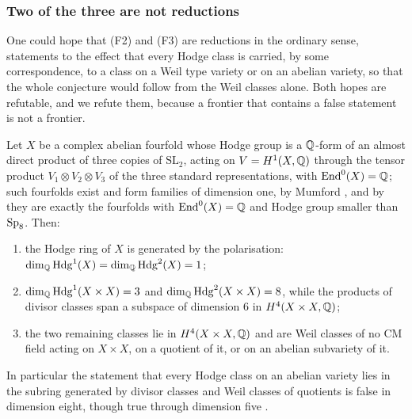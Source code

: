 \subsubsection*{Two of the three are not reductions}

One could hope that (F2) and (F3) are reductions in the ordinary sense,
statements to the effect that every Hodge class is carried, by some
correspondence, to a class on a Weil type variety or on an abelian variety,
so that the whole conjecture would follow from the Weil classes alone. Both
hopes are refutable, and we refute them, because a frontier that contains a
false statement is not a frontier.

\begin{proposition}\label{prop:mumfordproduct}
Let $X$ be a complex abelian fourfold whose Hodge group is a $\mathbb{Q}$-form of an
almost direct product of three copies of $\mathrm{SL}_{2}$, acting on
$V=H^{1}(X,\mathbb{Q})$ through the tensor product $V_{1}\otimes V_{2}\otimes V_{3}$
of the three standard representations, with $\operatorname{End}^{0}(X)=\mathbb{Q}$; such
fourfolds exist and form families of dimension one, by Mumford
\cite{Mum69}, and by \cite[2.5(i)]{MZ99} they are exactly the fourfolds
with $\operatorname{End}^{0}(X)=\mathbb{Q}$ and Hodge group smaller than $\operatorname{Sp}_{8}$. Then:
\begin{enumerate}[label=\textup{(\roman*)},nosep,leftmargin=2.6em]
\item the Hodge ring of $X$ is generated by the polarisation:
  $\dim_{\mathbb{Q}}\mathrm{Hdg}^{1}(X)=\dim_{\mathbb{Q}}\mathrm{Hdg}^{2}(X)=1$;
\item $\dim_{\mathbb{Q}}\mathrm{Hdg}^{1}(X\times X)=3$ and $\dim_{\mathbb{Q}}\mathrm{Hdg}^{2}(X\times X)=8$,
  while the products of divisor classes span a subspace of dimension $6$
  in $H^{4}(X\times X,\mathbb{Q})$;
\item the two remaining classes lie in $H^{4}(X\times X,\mathbb{Q})$ and are Weil
  classes of no CM field acting on $X\times X$, on a quotient of it, or on an
  abelian subvariety of it.
\end{enumerate}
In particular the statement that every Hodge class on an abelian variety
lies in the subring generated by divisor classes and Weil classes of
quotients is false in dimension eight, though true through dimension five
\cite{MZ99}.
\end{proposition}

